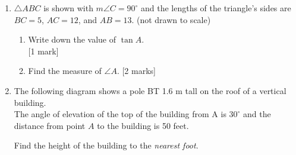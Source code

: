 \documentclass[12pt, twoside]{article}
\begin{document}
\begin{enumerate}
\newpage

\item $\triangle ABC$ is shown with $m\angle C=90^\circ$ and the lengths of the triangle's sides are $BC=5$, $AC=12$, and $AB=13$. (not drawn to scale)
  \begin{multicols}{2}
        \begin{enumerate}
        \item Write down the value of $\tan A$.  \\ \hfill [1 mark]\vspace{0.5cm}
        \item Find the measure of $\angle A$.  \hfill [2 marks] \vspace{1cm}
      \end{enumerate}
    \end{multicols} \vspace{2cm}

\item The following diagram shows a pole BT 1.6 m tall on the roof of a vertical building. \\[0.25cm]
  The angle of elevation of the top of the building from A is  
  $30^\circ$ and the distance from point $A$ to the building is 50 feet. 
    \begin{center}
      \end{center}
      Find the height of the building to the \emph{nearest foot}.

\end{enumerate}
\end{document}
